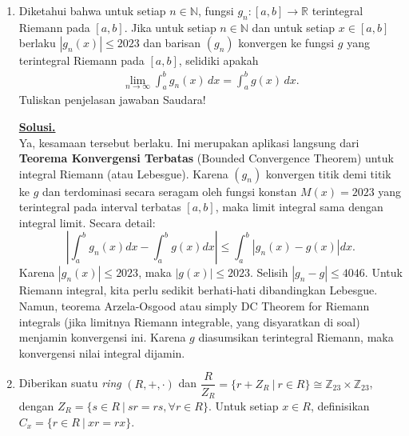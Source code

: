 \documentclass[12pt,twoside]{article}
\newenvironment{solution}
{
	\par\noindent\textbf{\underline{Solusi.}}\\
}
{
	\par
}
\begin{document}
\begin{enumerate}
\begin{solution}
          \textbf{(b)}
          Definisi turunan:
          \[ (f^*)'(z) = \lim_{h \to 0} \frac{f^*(z+h) - f^*(z)}{h} = \lim_{h \to 0} \frac{\overline{f(\overline{z+h})} - \overline{f(\bar{z})}}{h}. \]
          \[ = \lim_{h \to 0} \overline{\left( \frac{f(\bar{z}+\bar{h}) - f(\bar{z})}{\bar{h}} \right)}. \]
          Karena $h \to 0 \iff \bar{h} \to 0$. Misalkan $k = \bar{h}$.
          \[ = \overline{\lim_{k \to 0} \frac{f(\bar{z}+k) - f(\bar{z})}{k}} = \overline{f'(\bar{z})}. \]
          Terbukti.
        \end{solution}
  \item Diketahui bahwa untuk setiap $n\in\mathbb{N}$, fungsi $g_n:[a,b]\to \mathbb{R}$ terintegral Riemann pada $[a,b]$. Jika untuk setiap $n\in\mathbb{N}$ dan untuk setiap $x\in[a,b]$ berlaku $|g_n(x)|\leq 2023$ dan barisan $(g_n)$ konvergen ke fungsi $g$ yang terintegral Riemann pada $[a,b]$, selidiki apakah
        \begin{align*}
          \lim_{n\to\infty}\int_a^b g_n(x)\, dx=\int_a^b g(x)\, dx.
        \end{align*}
        Tuliskan penjelasan jawaban Saudara!
        \begin{solution}
          Ya, kesamaan tersebut berlaku.
          Ini merupakan aplikasi langsung dari \textbf{Teorema Konvergensi Terbatas} (Bounded Convergence Theorem) untuk integral Riemann (atau Lebesgue).
          Karena $(g_n)$ konvergen titik demi titik ke $g$ dan terdominasi secara seragam oleh fungsi konstan $M(x) = 2023$ yang terintegral pada interval terbatas $[a,b]$, maka limit integral sama dengan integral limit.
          Secara detail:
          \[ \left| \int_a^b g_n(x) dx - \int_a^b g(x) dx \right| \le \int_a^b |g_n(x) - g(x)| dx. \]
          Karena $|g_n(x)| \le 2023$, maka $|g(x)| \le 2023$. Selisih $|g_n - g| \le 4046$.
          Untuk Riemann integral, kita perlu sedikit berhati-hati dibandingkan Lebesgue. Namun, teorema Arzela-Osgood atau simply DC Theorem for Riemann integrals (jika limitnya Riemann integrable, yang disyaratkan di soal) menjamin konvergensi ini.
          Karena $g$ diasumsikan terintegral Riemann, maka konvergensi nilai integral dijamin.
        \end{solution}
  \item Diberikan suatu \textit{ring} $(R,+,\cdot)$ dan $\dfrac{R}{Z_R}=\{r+Z_R~|~r\in R\}\cong \mathbb{Z}_{23}\times \mathbb{Z}_{23}$, dengan $Z_R=\{s\in R~|~sr=rs,\forall r\in R\}$. Untuk setiap $x\in R$, definisikan $C_x=\{r\in R~|~xr=rx\}$.
        \begin{enumerate}

\end{enumerate}
\end{enumerate}
\end{document}
